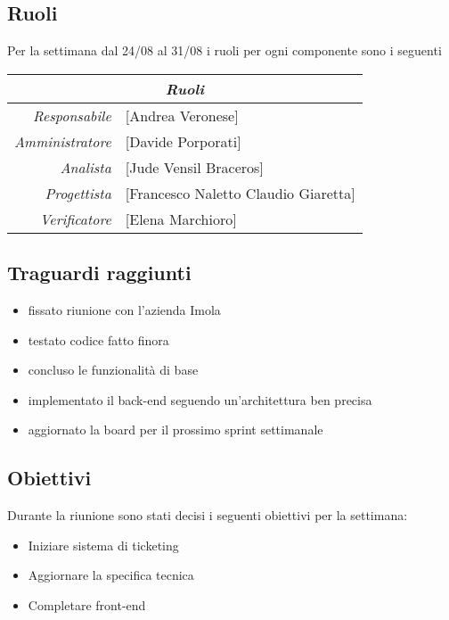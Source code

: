 \documentclass[12pt]{article}
\begin{document}
\subsection{Ruoli}
Per la settimana dal 24/08 al 31/08 i ruoli per ogni componente sono i seguenti
\\
\begin{tabular}{r | l}
    \multicolumn{2}{c}{\textit{Ruoli}}\\
    \hline
    \textit{Responsabile} &
    [Andrea Veronese]\makecell{}\\
    \textit{Amministratore} &
    [Davide Porporati]\makecell{}\\
    \textit{Analista} &
    [Jude Vensil Braceros]\makecell{}\\
    \textit{Progettista} &
    [Francesco Naletto Claudio Giaretta]\makecell{}\\
    \textit{Verificatore} & 
    [Elena Marchioro]\makecell{}\\
\end{tabular}

\subsection{Traguardi raggiunti}
\begin{itemize}
    \item fissato riunione con l'azienda Imola
    \item testato codice fatto finora
    \item concluso le funzionalità di base
    \item implementato il back-end seguendo un'architettura ben precisa
    \item aggiornato la board per il prossimo sprint settimanale
\end{itemize}

\subsection{Obiettivi}
Durante la riunione sono stati decisi i seguenti obiettivi per la settimana:
\begin{itemize}
    \item Iniziare sistema di ticketing
    \item Aggiornare la specifica tecnica
    \item Completare front-end
\end{itemize}
\end{document}
